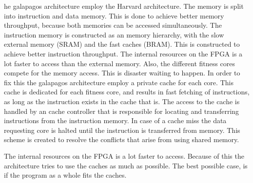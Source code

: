 he galapagos architecture employ the Harvard architecture. The memory is split into instruction and data memory. This is done to achieve better memory throughput, because both memories can be accessed simultaneously. The instruction memory is constructed as an memory hierarchy, with the slow external memory (SRAM) and the fast caches (BRAM). This is constructed to achieve better instruction throughput. The internal resources on the FPGA is a lot faster to access than the external memory. Also, the different fitness cores compete for the memory access. This is disaster waiting to happen. In order to fix this the galapagos architecture employ a private cache for each core. This cache is dedicated for each fitness core, and results in fast fetching of instructions, as long as the instruction exists in the cache that is.  The access to the cache is handled by an cache controller that is responsible for locating and transferring instructions from the instruction memory. In case of a cache miss the data requesting core is halted until the instruction is transferred from memory. This scheme is created to resolve the conflicts that arise from using shared memory. 


The internal resources on the FPGA is a lot faster to access. Because of this the architecture tries to use the caches as much as possible. The best possible case, is if the program as a whole fits the caches.  

